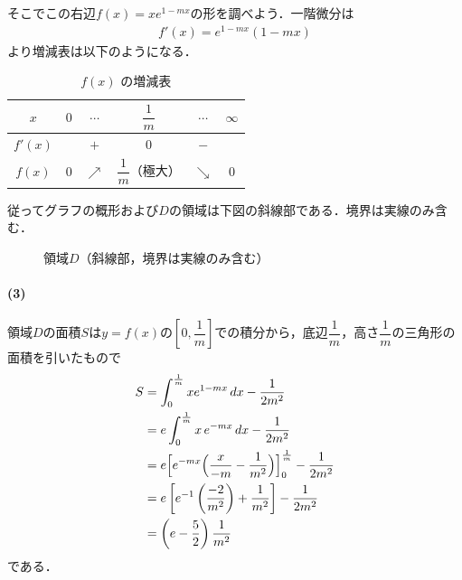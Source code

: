 \documentclass[../../main.tex]{subfiles}
\begin{document}
そこでこの右辺$f(x) = xe^{1-mx}$の形を調べよう．一階微分は
\begin{align}
  f'(x)=e^{1-mx}(1-mx)
\end{align}
より増減表は以下のようになる．

\begin{table}[htb]
  \centering
  \caption{$f(x)$ の増減表}
  \label{tab:f_x}
  \begin{tabular}{c|ccccc}
    $x$ & $0$ & $\cdots$ & $\dfrac{1}{m}$ & $\cdots$ & $\infty$ \\ \hline
    $f'(x)$ & & $+$ & $0$ & $-$ & \\ \hline
    $f(x)$ & $0$ & $\nearrow$ & $\dfrac{1}{m}$（極大） & $\searrow$ & $0$
  \end{tabular}
\end{table}

従ってグラフの概形および$D$の領域は下図の斜線部である．境界は実線のみ含む．

\begin{figure}[htb]
  \centering
  \caption{領域$D$（斜線部，境界は実線のみ含む）}
\end{figure}

\paragraph{(3)}

領域$D$の面積$S$は$y=f(x)$の$\left[0,\dfrac{1}{m}\right]$での積分から，底辺$\dfrac{1}{m}$，高さ$\dfrac{1}{m}$の三角形の面積を引いたもので
\begin{align}
  S
  &=\int_0^{\frac{1}{m}} x e^{1-mx} \,dx - \dfrac{1}{2m^2} \\
  &=e\int_0^{\frac{1}{m}}x\,e^{-mx}\,dx-\dfrac{1}{2m^2} \\
  &=e\Bigl[e^{-mx}\Bigl(\dfrac{x}{-m}-\dfrac{1}{m^2}\Bigr)\Bigr]_0^{\frac{1}{m}} - \dfrac{1}{2m^2} \\
  &=e\left[e^{-1}\left(\dfrac{-2}{m^2}\right) + \dfrac{1}{m^2}\right] - \dfrac{1}{2m^2} \\
  &=\left(e-\dfrac{5}{2}\right)\dfrac{1}{m^2}
\end{align}
である．

\newpage
\end{document}
